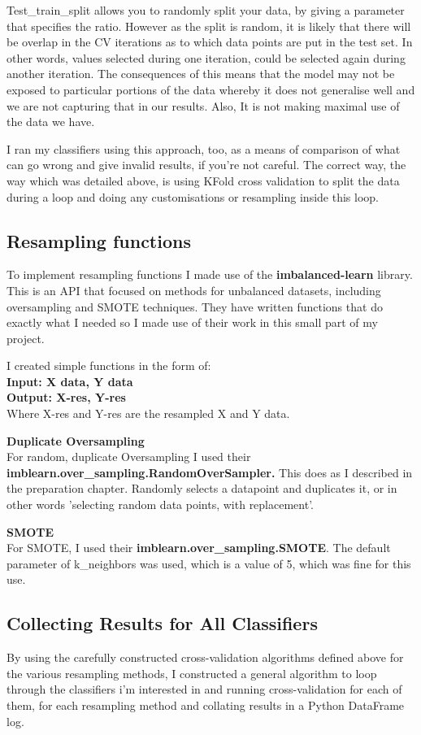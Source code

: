 \documentclass[12pt,a4paper,twoside]{report}
\begin{document}
Test\_train\_split allows you to randomly split your data, by giving a parameter that specifies the ratio. However as the split is random, it is likely that there will be overlap in the CV iterations as to which data points are put in the test set. In other words, values selected during one iteration, could be selected again during another iteration.
The consequences of this means that the model may not be exposed to particular portions of the data whereby it does not generalise well and we are not capturing that in our results. Also, It is not making maximal use of the data we have.

I ran my classifiers using this approach, too, as a means of comparison of what can go wrong and give invalid results, if you're not careful. The correct way, the way which was detailed above, is using KFold cross validation to split the data during a loop and doing any customisations or resampling inside this loop.

\subsection{Resampling functions}
To implement resampling functions I made use of the \textbf{imbalanced-learn}\cite{JMLR:v18:16-365} library. This is an API that focused on methods for unbalanced datasets, including oversampling and SMOTE techniques. They have written functions that do exactly what I needed so I made use of their work in this small part of my project. 

I created simple functions in the form of:\\
\textbf{Input: X data, Y data}\\
\textbf{Output: X-res, Y-res}\\
Where X-res and Y-res are the resampled X and Y data. 

\textbf{Duplicate Oversampling}\\
For random, duplicate Oversampling I used their \textbf{imblearn.over\_sampling.RandomOverSampler.} This does as I described in the preparation chapter. Randomly selects a datapoint and duplicates it, or in other words 'selecting random data points, with replacement'.

\textbf{SMOTE}\\
For SMOTE, I used their \textbf{imblearn.over\_sampling.SMOTE}. The default parameter of k\_neighbors was used, which is a value of 5, which was fine for this use. 

\subsection{Collecting Results for All Classifiers}
By using the carefully constructed cross-validation algorithms defined above for the various resampling methods, I constructed a general algorithm to loop through the classifiers i'm interested in and running cross-validation for each of them, for each resampling method and collating results in a Python DataFrame log. 
\end{document}
